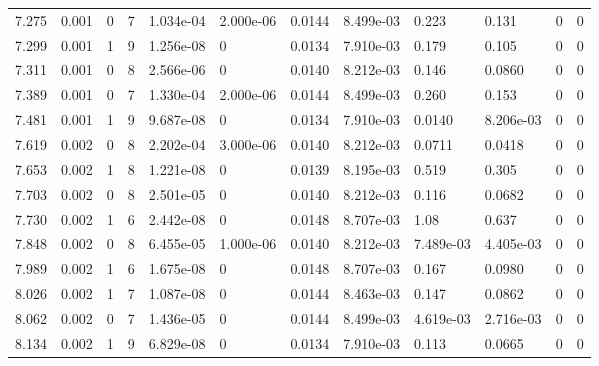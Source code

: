 \documentclass[preview]{standalone}
\begin{document}
{{{\begin{tabular}{L{1.2cm}C{1.2cm} C{0.3cm}C{0.5cm} C{1.4cm}C{1.4cm} C{1.4cm}C{1.4cm} C{1.6cm}C{1.6cm} C{1.6cm}C{1.6cm}}
  7.275  &  0.001  & 0     &  7 &  1.034e-04  & 2.000e-06  &  0.0144&   8.499e-03& 0.223 & 0.131   &  0 & 0  \\ 
  7.299  &  0.001  & 1     &  9 &  1.256e-08  & 0  &  0.0134&   7.910e-03& 0.179 & 0.105   &  0 & 0  \\ 
  7.311  &  0.001  & 0     &  8 &  2.566e-06  & 0  &  0.0140&   8.212e-03& 0.146 & 0.0860   &  0 & 0  \\ 
  7.389  &  0.001  & 0     &  7 &  1.330e-04  & 2.000e-06  &  0.0144&   8.499e-03& 0.260 & 0.153   &  0 & 0  \\ 
  7.481  &  0.001  & 1     &  9 &  9.687e-08  & 0  &  0.0134&   7.910e-03& 0.0140 & 8.206e-03   &  0 & 0  \\ 
  7.619  &  0.002  & 0     &  8 &  2.202e-04  & 3.000e-06  &  0.0140&   8.212e-03& 0.0711 & 0.0418   &  0 & 0  \\ 
  7.653  &  0.002  & 1     &  8 &  1.221e-08  & 0  &  0.0139&   8.195e-03& 0.519 & 0.305   &  0 & 0  \\ 
  7.703  &  0.002  & 0     &  8 &  2.501e-05  & 0  &  0.0140&   8.212e-03& 0.116 & 0.0682   &  0 & 0  \\ 
  7.730  &  0.002  & 1     &  6 &  2.442e-08  & 0  &  0.0148&   8.707e-03& 1.08 & 0.637   &  0 & 0  \\ 
  7.848  &  0.002  & 0     &  8 &  6.455e-05  & 1.000e-06  &  0.0140&   8.212e-03& 7.489e-03 & 4.405e-03   &  0 & 0  \\ 
  7.989  &  0.002  & 1     &  6 &  1.675e-08  & 0  &  0.0148&   8.707e-03& 0.167 & 0.0980   &  0 & 0  \\ 
  8.026  &  0.002  & 1     &  7 &  1.087e-08  & 0  &  0.0144&   8.463e-03& 0.147 & 0.0862   &  0 & 0  \\ 
  8.062  &  0.002  & 0     &  7 &  1.436e-05  & 0  &  0.0144&   8.499e-03& 4.619e-03 & 2.716e-03   &  0 & 0  \\ 
  8.134  &  0.002  & 1     &  9 &  6.829e-08  & 0  &  0.0134&   7.910e-03& 0.113 & 0.0665   &  0 & 0  \\ 
\hline 
\end{tabular} 

}}}
\end{document}
